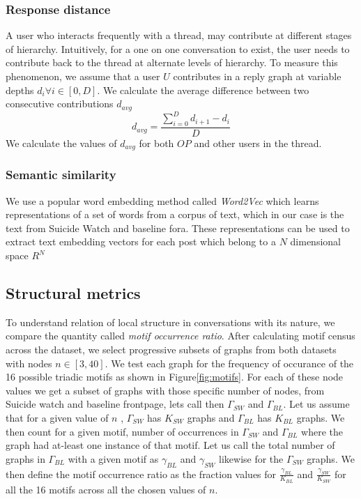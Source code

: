 \subsubsection{Response distance}
A user who interacts frequently with a thread, may contribute at different stages of hierarchy. Intuitively, for a one on one conversation to exist, the user needs to contribute back to the thread at alternate levels of hierarchy. To measure this phenomenon, we assume that a user $U$ contributes in a reply graph at variable depths $d_i \forall i \in [0,D]$. 
We calculate the average difference between two consecutive contributions $d_{avg}$
$$ d_{avg} = \frac{\sum_{i=0}^{D} d_{i+1} - d_i }{D}$$
We calculate the values of $d_{avg}$ for both $OP$ and other users in the thread.


\subsubsection{Semantic similarity}
\label{Topic}
We use a popular word embedding method called \textit{Word2Vec} \cite{mikolov2013distributed} which learns representations of a set of words from a corpus of text, which in our case is the text from Suicide Watch and baseline fora. These representations can be used to extract text embedding vectors for each post which belong to a $N$ dimensional space $R^N$




\subsection{Structural metrics}
To understand relation of local structure in conversations with its nature, we compare the quantity called \textsl{motif occurrence ratio}. After calculating motif census across the dataset\cite{Batagelj2001}, we select progressive subsets of graphs from both datasets with nodes $n \in [3 , 40]$.  We test each graph for the frequency of occurance of the 16 possible triadic motifs as shown in Figure\ref{fig:motifs}. For each of these node values we get a subset of graphs with those specific number of nodes, from Suicide watch and baseline frontpage, lets call then $\Gamma_{SW}$ and $\Gamma_{BL}$. Let us assume that for a given value of $n$ , $\Gamma_{SW}$ has $K_{SW}$ graphs and $\Gamma_{BL}$ has $K_{BL}$ graphs. We then count for a given motif, number of occurrences in $\Gamma_{SW}$ and $\Gamma_{BL}$ where the graph had at-least one instance of that motif. Let us call the total number of graphs in $\Gamma_{BL}$ with a given motif as $\gamma_{BL}$ and $\gamma_{SW}$ likewise for the $\Gamma_{SW}$ graphs. 
We then define the motif occurrence ratio as the fraction values for $\frac{\gamma_{BL}}{K_{BL}}$ and $\frac{\gamma_{SW}}{K_{SW}}$ for all the 16 motifs across all the chosen values of $n$. 


